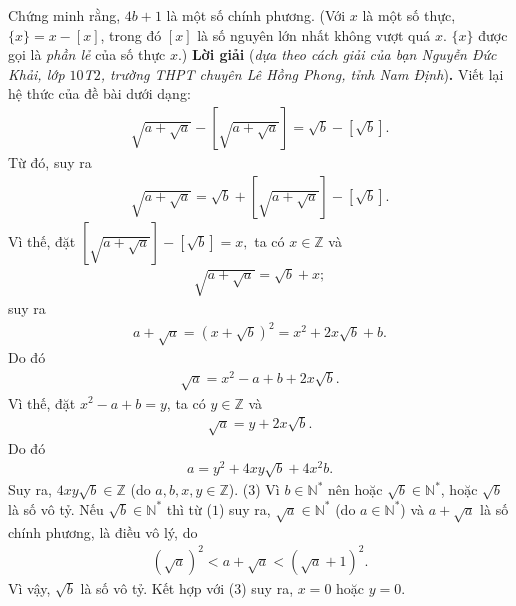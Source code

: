 \begin{multicols}{2}
	Chứng minh rằng, $4b+1$ là một số chính phương.
	\vskip 0.05cm
	(Với $x$ là một số thực, $\{x\}=x-[x]$, trong đó $[x]$ là số nguyên lớn nhất không vượt quá $x$. $\{x\}$ được gọi là {\it phần lẻ} của số thực $x$.)
	\vskip 0.05cm
	\textbf{\color{thachthuctoanhoc}Lời giải} (\textit{dựa theo cách giải của bạn Nguyễn Đức Khải, lớp $10$T$2$, trường THPT chuyên Lê Hồng Phong, tỉnh Nam Định})\textbf{\color{thachthuctoanhoc}.}
	\vskip 0.05cm
	Viết lại hệ thức của đề bài dưới dạng:
	\begin{align*}
		\sqrt {a + \sqrt a }  - \left[ {\sqrt {a + \sqrt a } } \right] = \sqrt b  - \left[ {\sqrt b } \right].
	\end{align*}
	Từ đó, suy ra
	\begin{align*}
		\sqrt {a + \sqrt a }  = \sqrt b  + \left[ {\sqrt {a + \sqrt a } } \right] - \left[ {\sqrt b } \right].
	\end{align*}
	Vì thế, đặt $\left[ {\sqrt {a + \sqrt a } } \right] - \left[ {\sqrt b } \right] = x,$  ta có $x \in \mathbb{Z}$ và
	\begin{align*}
		\sqrt {a + \sqrt a }  = \sqrt b  + x;
	\end{align*}
	suy ra
	\begin{align*}
		a \!+\! \sqrt a  \!=\! {\left( {x \!+\! \sqrt b } \right)^2} \!=\! {x^2} \!+\! 2x\sqrt b  \!+\! b. \tag{$1$}
	\end{align*}
	Do đó
	\begin{align*}
		\sqrt a  = {x^2} - a + b + 2x\sqrt b .
	\end{align*}
	Vì thế, đặt ${x^2} - a + b = y$,  ta có  $y \in \mathbb{Z}$ và
	\begin{align*}
		\sqrt a  = y + 2x\sqrt b .
	\end{align*}
	Do đó
	\begin{align*}
		a = {y^2} + 4xy\sqrt b  + 4{x^2}b.
	\end{align*}
	Suy ra, $4xy\sqrt{b} \in \mathbb{Z}$ (do $a, b, x, y \in \mathbb{Z}$). \hfill ($3$)
	\vskip 0.05cm
	Vì $b \in \mathbb{N^*}$  nên hoặc $\sqrt{b} \in \mathbb{N^*}$,  hoặc $\sqrt{b}$  là số vô tỷ.
	\vskip 0.05cm
	Nếu $\sqrt{b} \in \mathbb{N^*}$ thì từ ($1$) suy ra, $\sqrt{a} \in \mathbb{N^*}$  (do  $a \in \mathbb{N^*}$) và $a + \sqrt{a}$  là số chính phương, là điều vô lý, do
	\begin{align*}
		{\left( {\sqrt a } \right)^2} < a + \sqrt a  < {\left( {\sqrt a  + 1} \right)^2}.
	\end{align*}
	Vì vậy, $\sqrt{b}$  là số vô tỷ. Kết hợp với ($3$) suy ra, $x = 0$ hoặc $y = 0$.
	\vskip 0.05cm

\end{multicols}
